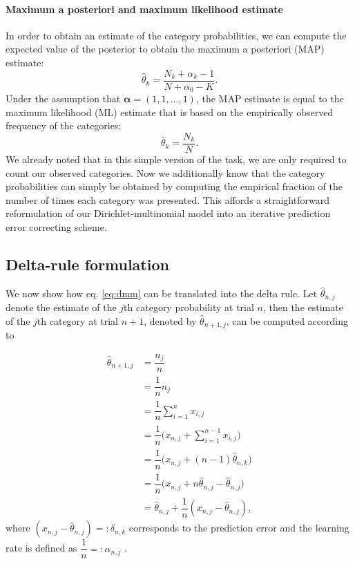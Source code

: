 \documentclass[a4paper,12pt]{article} 			%
\begin{document}
\paragraph{Maximum a posteriori and maximum likelihood estimate}
In order to obtain an estimate of the category probabilities, we can compute the expected value of the posterior to obtain the maximum a posteriori (MAP) estimate:
\begin{equation}
\hat{\theta}_k = \dfrac{N_k+\alpha_k-1}{N+\alpha_0-K}.
\end{equation}
Under the assumption that $\boldsymbol{\alpha} = (1,1,...,1)$, the MAP estimate is equal to the maximum likelihood (ML) estimate that is based on the empirically observed frequency of the categories:
\begin{equation}
\hat{\theta}_k = \dfrac{N_k}{N}.
\label{eq:dmm}
\end{equation}
We already noted that in this simple version of the task, we are only required to count our observed categories. Now we additionally know that the category probabilities can simply be obtained by computing the empirical fraction of the number of times each category was presented. This affords a straightforward reformulation of our Dirichlet-multinomial model into an iterative prediction error correcting scheme.


\subsection{Delta-rule formulation}\label{delta}

We now show how eq. \ref{eq:dmm} can be translated into the delta rule. Let $\hat{\theta}_{n,j}$ denote the estimate of the $j$th category probability at trial $n$, then the estimate of the $j$th category at trial $n+1$, denoted by $\hat{\theta}_{n+1,j}$, can be computed according to 


\begin{equation}
\begin{aligned}
\hat{\theta}_{n+1,j} &= \dfrac{n_{j}}{n} \\ 
&= \dfrac{1}{n}n_{j} \\ 
&= \dfrac{1}{n}\sum_{i=1}^{n}x_{i,j} \\
&= \dfrac{1}{n}\Big(x_{n,j} + \sum_{i=1}^{n-1}x_{i,j}  \Big) \\
&= \dfrac{1}{n}\Big(x_{n,j} + (n-1)\hat{\theta}_{n,k} \Big) \\
&= \dfrac{1}{n}\big(x_{n,j}+n\hat{\theta}_{n,j}-\hat{\theta}_{n,j}\big) \\
&= \hat{\theta}_{n,j} + \dfrac{1}{n}(x_{n,j} - \hat{\theta}_{n,j}),
\end{aligned}
\label{eq:model}
\end{equation}
where $(x_{n,j}-\hat{\theta}_{n,j}) =: \delta_{n,k}$ corresponds to the prediction error and the learning rate is defined as $\dfrac{1}{n}=:\alpha_{n,j}$ \citep{Sutton1998}.
\end{document}
